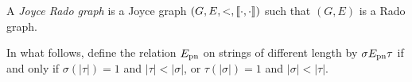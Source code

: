 

\begin{definition}
  A \emph{Joyce Rado graph} is a Joyce graph $(G,E,<, \llbracket \cdot , \cdot \rrbracket)$ such that $(G,E)$ is a Rado graph.
\end{definition}

\index{$\Epn$}In what follows, define the relation $\Epn$ on strings of different length by $\sigma E_{\mathrm{pn}}\tau$ if and only if $\sigma(|\tau|)=1$ and $|\tau|<|\sigma|$, or $\tau(|\sigma|)=1$ and $|\sigma|<|\tau|$.

